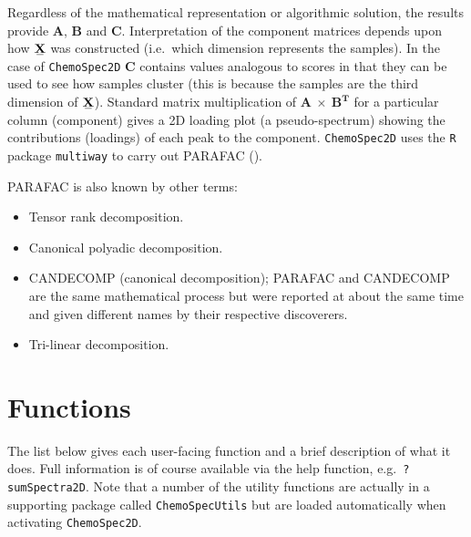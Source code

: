 \documentclass[letter,10pt,twocolumn,twoside,printwatermark=false]{pinp}
\providecommand{\tightlist}{%
  \setlength{\itemsep}{0pt}\setlength{\parskip}{0pt}}
\begin{document}
Regardless of the mathematical representation or algorithmic solution,
the results provide \(\mathbf{A}\), \(\mathbf{B}\) and \(\mathbf{C}\).
Interpretation of the component matrices depends upon how
\(\stackunder[1.2pt]{$\mathbf{X}$}{\rule{1.2ex}{.075ex}}\) was
constructed (i.e.~which dimension represents the samples). In the case
of \texttt{ChemoSpec2D} \(\mathbf{C}\) contains values analogous to
scores in that they can be used to see how samples cluster (this is
because the samples are the third dimension of
\(\stackunder[1.2pt]{$\mathbf{X}$}{\rule{1.2ex}{.075ex}}\)). Standard
matrix multiplication of \(\mathbf{A} \ \times \ \mathbf{B^T}\) for a
particular column (component) gives a 2D loading plot (a
pseudo-spectrum) showing the contributions (loadings) of each peak to
the component. \texttt{ChemoSpec2D} uses the \texttt{R} package
\texttt{multiway} to carry out PARAFAC (\cite{Helwig2017}).

PARAFAC is also known by other terms:

\begin{itemize}
\tightlist
\item
  Tensor rank decomposition.
\item
  Canonical polyadic decomposition.
\item
  CANDECOMP (canonical decomposition); PARAFAC and CANDECOMP are the
  same mathematical process but were reported at about the same time and
  given different names by their respective discoverers.
\item
  Tri-linear decomposition.
\end{itemize}

\hypertarget{functions}{%
\section{Functions}\label{functions}}

The list below gives each user-facing function and a brief description
of what it does. Full information is of course available via the help
function, e.g.~\texttt{?sumSpectra2D}. Note that a number of the utility
functions are actually in a supporting package called
\texttt{ChemoSpecUtils} but are loaded automatically when activating
\texttt{ChemoSpec2D}.
\end{document}
